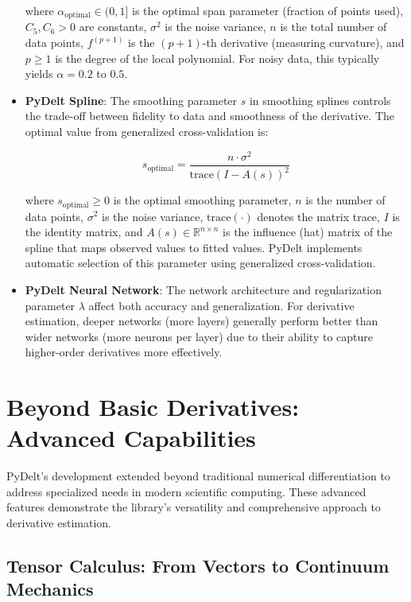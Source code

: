 \documentclass[10pt,journal,compsoc]{IEEEtran}
\begin{document}
\begin{itemize}
    where $\alpha_{\text{optimal}} \in (0,1]$ is the optimal span parameter (fraction of points used), $C_5, C_6 > 0$ are constants, $\sigma^2$ is the noise variance, $n$ is the total number of data points, $f^{(p+1)}$ is the $(p+1)$-th derivative (measuring curvature), and $p \geq 1$ is the degree of the local polynomial. For noisy data, this typically yields $\alpha = 0.2$ to $0.5$.
    
    \item \textbf{PyDelt Spline}: The smoothing parameter $s$ in smoothing splines controls the trade-off between fidelity to data and smoothness of the derivative. The optimal value from generalized cross-validation is:
    
    \begin{equation}
        s_{\text{optimal}} = \frac{n \cdot \sigma^2}{\text{trace}(I - A(s))^2}
    \end{equation}
    
    where $s_{\text{optimal}} \geq 0$ is the optimal smoothing parameter, $n$ is the number of data points, $\sigma^2$ is the noise variance, $\text{trace}(\cdot)$ denotes the matrix trace, $I$ is the identity matrix, and $A(s) \in \mathbb{R}^{n \times n}$ is the influence (hat) matrix of the spline that maps observed values to fitted values. PyDelt implements automatic selection of this parameter using generalized cross-validation.
    
    \item \textbf{PyDelt Neural Network}: The network architecture and regularization parameter $\lambda$ affect both accuracy and generalization. For derivative estimation, deeper networks (more layers) generally perform better than wider networks (more neurons per layer) due to their ability to capture higher-order derivatives more effectively.
\end{itemize}

\section{Beyond Basic Derivatives: Advanced Capabilities}

PyDelt's development extended beyond traditional numerical differentiation to address specialized needs in modern scientific computing. These advanced features demonstrate the library's versatility and comprehensive approach to derivative estimation.

\subsection{Tensor Calculus: From Vectors to Continuum Mechanics}
\end{document}
